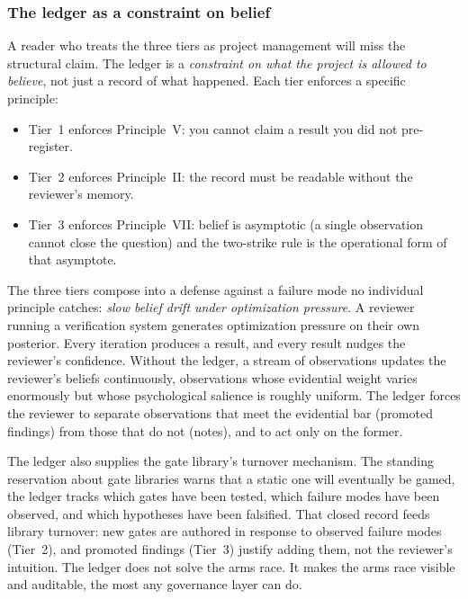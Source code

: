\documentclass[
  11pt,
]{article}
\begin{document}
\subsubsection{The ledger as a constraint on
belief}\label{the-ledger-as-a-constraint-on-belief}

A reader who treats the three tiers as project management will miss the
structural claim. The ledger is a \emph{constraint on what the
project is allowed to believe}, not just a record of what happened.
Each tier enforces a specific principle:

\begin{itemize}
\item
  Tier~1 enforces Principle~V: you cannot claim a result you did not
  pre-register.
\item
  Tier~2 enforces Principle~II: the record must be readable without the
  reviewer's memory.
\item
  Tier~3 enforces Principle~VII: belief is asymptotic (a single
  observation cannot close the question) and the two-strike rule is the
  operational form of that asymptote.
\end{itemize}

The three tiers compose into a defense against a failure mode no
individual principle catches: \emph{slow belief drift under optimization
pressure}. A reviewer running a verification system generates
optimization pressure on their own posterior. Every iteration produces a
result, and every result nudges the reviewer's confidence. Without the
ledger, a stream of
observations updates the reviewer's beliefs continuously, observations whose evidential weight varies enormously but whose
psychological salience is roughly uniform. The ledger forces the
reviewer to separate observations that meet the evidential
bar (promoted findings) from those that do not (notes), and to act
only on the former.

The ledger also supplies the gate library's turnover mechanism.
The standing reservation about gate libraries warns that a static one
will eventually be gamed, the ledger tracks which gates have been
tested, which failure modes have been observed, and which hypotheses
have been falsified. That closed record feeds library turnover: new
gates are authored in response to observed failure modes (Tier~2), and
promoted findings (Tier~3) justify adding them,
not the reviewer's intuition. The ledger does not solve the
arms race. It makes the arms race visible and auditable, the
most any governance layer can do.
\end{document}
